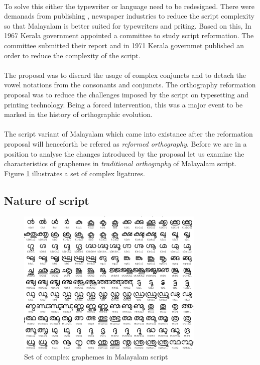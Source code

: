 \documentclass[10pt]{article}
\begin{document}
\paragraph{}
To solve this either the typewriter or language need to be redesigned. There were demanads from publishing , newspaper industries to reduce the script complexity so that Malayalam is better suited for typewriters and priting. Based on this, In 1967 Kerala government appointed a committee to study script reformation. The committee submitted their report and in 1971 Kerala governmet published an order to reduce the complexity of the script.

\paragraph{}
The proposal was to discard the usage of complex conjuncts and to detach the vowel notations from the consonants and conjuncts. The orthography reformation proposal was to reduce the challenges imposed by the script on typesetting and printing technology. Being a forced intervention, this was a major event to be marked in the history of orthographic evolution. 

\paragraph{}
The script variant of Malayalam which came into existance after the reformation proposal will henceforth be refered as \textit{reformed orthography}. Before we are in a position to analyse the changes introduced by the proposal let us examine the characteristics of graphemes in \textit{traditional orthography} of Malayalam script. Figure \ref{complexgrapheme} illustrates a set of complex ligatures. 

\subsection{Nature of script}
\begin{figure}[h!]
	\centering
	\includegraphics[width=0.8\textwidth]{images/complexgraphemes.png}
	\caption{Set of complex graphemes in Malayalam script}
	\label{complexgrapheme}
\end{figure}
\end{document}
